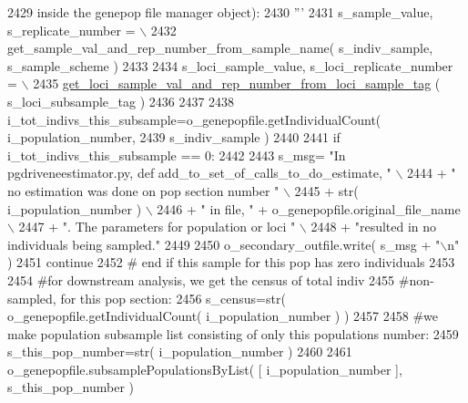 \begin{DoxyCode}
2429 \textcolor{stringliteral}{                inside the genepop file manager object):}
2430 \textcolor{stringliteral}{                '''}
2431                 s\_sample\_value, s\_replicate\_number = \(\backslash\)
2432                         get\_sample\_val\_and\_rep\_number\_from\_sample\_name( s\_indiv\_sample, s\_sample\_scheme )
2433 
2434                 s\_loci\_sample\_value, s\_loci\_replicate\_number = \(\backslash\)
2435                         \hyperlink{namespacenegui_1_1pgdriveneestimator_ac6e046ac333dcd975329026d752ea2d9}{get\_loci\_sample\_val\_and\_rep\_number\_from\_loci\_sample\_tag}
      ( s\_loci\_subsample\_tag )
2436                 
2437 
2438                 i\_tot\_indivs\_this\_subsample=o\_genepopfile.getIndividualCount( i\_population\_number, 
2439                                                                                         s\_indiv\_sample )
2440 
2441                 \textcolor{keywordflow}{if} i\_tot\_indivs\_this\_subsample == 0:
2442 
2443                     s\_msg= \textcolor{stringliteral}{"In pgdriveneestimator.py, def add\_to\_set\_of\_calls\_to\_do\_estimate, "} \(\backslash\)
2444                                     + \textcolor{stringliteral}{" no estimation was done on pop section number "}  \(\backslash\)
2445                                     + str( i\_population\_number ) \(\backslash\)
2446                                     + \textcolor{stringliteral}{" in file, "} + o\_genepopfile.original\_file\_name \(\backslash\)
2447                                     + \textcolor{stringliteral}{".  The parameters for population or loci "} \(\backslash\)
2448                                     + \textcolor{stringliteral}{"resulted in no individuals being sampled."}
2449 
2450                     o\_secondary\_outfile.write( s\_msg + \textcolor{stringliteral}{"\(\backslash\)n"} )
2451                     \textcolor{keywordflow}{continue}
2452                 \textcolor{comment}{# end if this sample for this pop has zero individuals}
2453 
2454                 \textcolor{comment}{#for downstream analysis, we get the census of total indiv}
2455                 \textcolor{comment}{#non-sampled, for this pop section:}
2456                 s\_census=str( o\_genepopfile.getIndividualCount( i\_population\_number ) )
2457 
2458                 \textcolor{comment}{#we make population subsample list consisting of only this populations number:}
2459                 s\_this\_pop\_number=str( i\_population\_number ) 
2460 
2461                 o\_genepopfile.subsamplePopulationsByList( [ i\_population\_number ], s\_this\_pop\_number )

\end{DoxyCode}
